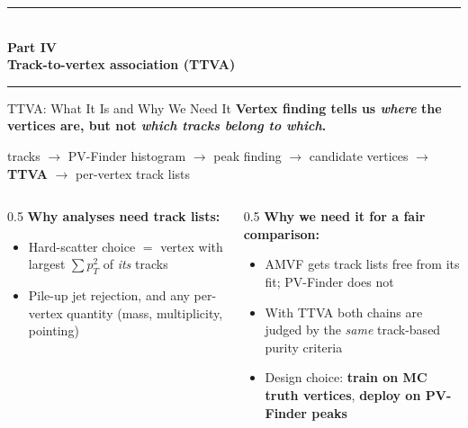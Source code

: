\documentclass[xcolor=table,aspectratio=169]{beamer}
\newcommand{\partdivider}[2]{%
    \begin{frame}[plain]
        \centering
        \vfill
        {\color{pennred}\rule{0.4\linewidth}{1.2pt}}\\[0.6em]
        {\Large\textbf{Part #1}}\\[0.4em]
        {\LARGE\textbf{\textcolor{pennred}{#2}}}\\[0.6em]
        {\color{pennred}\rule{0.4\linewidth}{1.2pt}}
        \vfill
    \end{frame}%
}
\begin{document}
\partdivider{IV}{Track-to-vertex association (TTVA)}

\begin{frame}{TTVA: What It Is and Why We Need It}
    \textbf{Vertex finding tells us \emph{where} the vertices are, but not \emph{which tracks belong to which}.}
    \vspace{0.5em}
    \begin{center}
        tracks \(\to\) PV-Finder histogram \(\to\) peak finding \(\to\) candidate vertices
        \(\to\) \textcolor{pennred}{\textbf{TTVA}} \(\to\) per-vertex track lists
    \end{center}
    \vspace{0.5em}
    \begin{columns}[t]
        \begin{column}{0.5\linewidth}
            \textbf{Why analyses need track lists:}
            \begin{itemize}
                \setlength\itemsep{0.35em}
                \item Hard-scatter choice $=$ vertex with largest $\sum p_T^2$ of \emph{its} tracks
                \item Pile-up jet rejection, and any per-vertex quantity (mass, multiplicity, pointing)
            \end{itemize}
        \end{column}
        \begin{column}{0.5\linewidth}
            \textbf{Why we need it for a fair comparison:}
            \begin{itemize}
                \setlength\itemsep{0.35em}
                \item AMVF gets track lists free from its fit; PV-Finder does not
                \item With TTVA both chains are judged by the \emph{same} track-based purity criteria
                \item Design choice: \textbf{train on MC truth vertices}, \textbf{deploy on PV-Finder peaks}
            \end{itemize}
        \end{column}
    \end{columns}
\end{frame}
\end{document}
